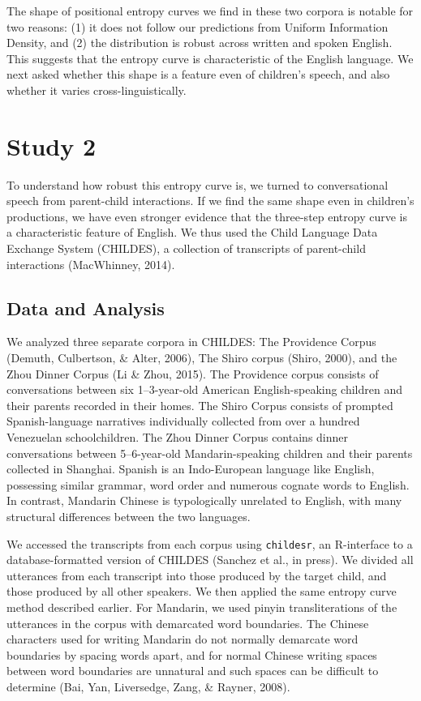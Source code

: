 \documentclass[10pt, letterpaper]{article}
\begin{document}
The shape of positional entropy curves we find in these two corpora is
notable for two reasons: (1) it does not follow our predictions from
Uniform Information Density, and (2) the distribution is robust across
written and spoken English. This suggests that the entropy curve is
characteristic of the English language. We next asked whether this shape
is a feature even of children's speech, and also whether it varies
cross-linguistically.

\section{Study 2}\label{study-2}

To understand how robust this entropy curve is, we turned to
conversational speech from parent-child interactions. If we find the
same shape even in children's productions, we have even stronger
evidence that the three-step entropy curve is a characteristic feature
of English. We thus used the Child Language Data Exchange System
(CHILDES), a collection of transcripts of parent-child interactions
(MacWhinney, 2014).

\subsection{Data and Analysis}\label{data-and-analysis-1}

We analyzed three separate corpora in CHILDES: The Providence Corpus
(Demuth, Culbertson, \& Alter, 2006), The Shiro corpus (Shiro, 2000),
and the Zhou Dinner Corpus (Li \& Zhou, 2015). The Providence corpus
consists of conversations between six 1--3-year-old American
English-speaking children and their parents recorded in their homes. The
Shiro Corpus consists of prompted Spanish-language narratives
individually collected from over a hundred Venezuelan schoolchildren.
The Zhou Dinner Corpus contains dinner conversations between
5--6-year-old Mandarin-speaking children and their parents collected in
Shanghai. Spanish is an Indo-European language like English, possessing
similar grammar, word order and numerous cognate words to English. In
contrast, Mandarin Chinese is typologically unrelated to English, with
many structural differences between the two languages.

We accessed the transcripts from each corpus using \texttt{childesr}, an
R-interface to a database-formatted version of CHILDES (Sanchez et al.,
in press). We divided all utterances from each transcript into those
produced by the target child, and those produced by all other speakers.
We then applied the same entropy curve method described earlier. For
Mandarin, we used pinyin transliterations of the utterances in the
corpus with demarcated word boundaries. The Chinese characters used for
writing Mandarin do not normally demarcate word boundaries by spacing
words apart, and for normal Chinese writing spaces between word
boundaries are unnatural and such spaces can be difficult to determine
(Bai, Yan, Liversedge, Zang, \& Rayner, 2008).
\end{document}
